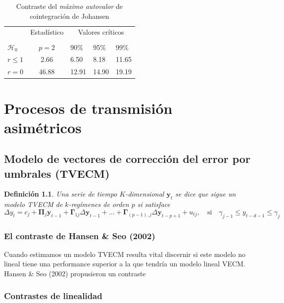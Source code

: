 \documentclass[12pt, twoside]{book}\usepackage[]{graphicx}\usepackage[]{color}
\let\bold\boldsymbol
\let\bf\mathbf
\numberwithin{equation}{section}
\numberwithin{theorem}{section}
\numberwithin{teorema}{section}
\newtheorem{defi}{Definición}
\newenvironment{defin}
      {\begin{shaded}\begin{defi}}
      {\end{defi}\end{shaded}}
\numberwithin{defi}{section}
\numberwithin{prop}{section}
\numberwithin{defi}{section}
\theoremstyle{plain}
\begin{document}
\begin{table}[H]
\begin{center}
\begin{tabular}{@{}lrllll@{}}
\toprule
\multicolumn{1}{l}{} & \multicolumn{2}{c}{Estadístico} & \multicolumn{3}{c}{Valores críticos} \\
\cmidrule(l){2-3} \cmidrule(l){4-6} \\
\multicolumn{1}{l}{$\mathcal{H}_0$} & \multicolumn{2}{c}{$p = 2$} &
\multicolumn{1}{l}{90\%}&
\multicolumn{1}{l}{95\%}&
\multicolumn{1}{l}{99\%}
\\
\midrule
$r \leq 1$ & \multicolumn{2}{c}{ 2.66} & 6.50 & 8.18 & 11.65\\
$r = 0$ & \multicolumn{2}{c}{46.88} & 12.91 & 14.90 & 19.19 \\
\bottomrule
\end{tabular}
\end{center}
\caption{Contraste del \textit{máximo autovalor} de cointegración de Johansen}
\label{tab-11}
\end{table}




\chapter{Procesos de transmisión asimétricos}
\section{Modelo de vectores de corrección del error por umbrales (TVECM)}
\begin{defin}
Una serie de tiempo $K$-dimensional $\bf{y}_{t}$ se dice que sigue un modelo TVECM de $k$-regímenes de orden $p$ si satisface
\begin{equation}
\Delta y_{t}=c_{j}+\bold{\Pi}_{j}\bf{y}_{t-1}+\bold{\Gamma}_{1j}\Delta \bf{y}_{t-1}+...+\bold{\Gamma}_{(p-1),j}\Delta \bf{y}_{t-p+1}+u_{tj}, \quad \text{si}\quad \gamma_{j-1}\leq y_{t-d-1}\leq \gamma_{j}
\end{equation}
\end{defin}
\subsection{El contraste de Hansen \& Seo (2002)}
Cuando estimamos un modelo TVECM resulta vital discernir si este modelo no lineal tiene una performance superior a la que tendría un modelo lineal VECM. Hansen \& Seo (2002) propusieron un contraste  

\subsection{Contrastes de linealidad}
\end{document}
